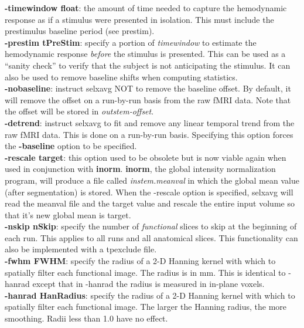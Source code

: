 \documentclass[10pt]{article}
\begin{document}
\noindent
{\bf -timewindow float}: the amount of time needed to capture the
hemodynamic response as if a stimulus were presented in isolation.
This must include the prestimulus baseline period (see prestim).\\

\noindent
{\bf -prestim tPreStim}: specify a portion of {\em timewindow} to
estimate the hemodynamic response {\em before} the stimulus is
presented.  This can be used as a ``sanity check'' to verify that the
subject is not anticipating the stimulus. It can also be used to
remove baseline shifts when computing statistics.\\

\noindent
{\bf -nobaseline}: instruct selxavg NOT to remove the baseline
offset. By default, it will remove the offset on a run-by-run basis
from the raw fMRI data. Note that the offset will be stored in {\em
outstem-offset}. \\

\noindent
{\bf -detrend}: instruct selxavg to fit and remove any linear temporal
trend from the raw fMRI data.  This is done on a run-by-run basis.
Specifying this option forces the {\bf -baseline} option to be
specified.\\

\noindent
{\bf -rescale target}: this option used to be obsolete but is now
viable again when used in conjunction with {\bf inorm}.  {\bf inorm},
the global intensity normalization program, will produce a file called
{\em instem.meanval} in which the global mean value (after
segmentation) is stored.  When the -rescale option is specified,
selxavg will read the meanval file and the target value and rescale
the entire input volume so that it's new global mean is target.\\

\noindent
{\bf -nskip nSkip}: specify the number of {\em functional} slices to
skip at the beginning of each run.  This applies to all runs and
all anatomical slices. This functionality can also be implemented with
a tpexclude file.\\

\noindent
{\bf -fwhm FWHM}: specify the radius of a 2-D Hanning kernel
with which to spatially filter each functional image. The radius is in
mm. This is identical to -hanrad except that in -hanrad the radius is
measured in in-plane voxels.\\

\noindent
{\bf -hanrad HanRadius}: specify the radius of a 2-D Hanning kernel
with which to spatially filter each functional image.  The larger
the Hanning radius, the more smoothing. Radii less than 1.0 have no
effect.\\
\end{document}
